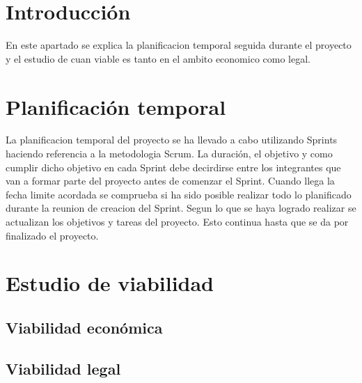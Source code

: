 
\section{Introducción}
En este apartado se explica la planificacion temporal seguida durante el proyecto y el estudio de cuan viable es tanto en el ambito economico como legal.
	
\section{Planificación temporal}
La planificacion temporal del proyecto se ha llevado a cabo utilizando Sprints haciendo referencia a la metodologia Scrum. La duración, el objetivo y como cumplir dicho objetivo en cada Sprint debe decirdirse entre los integrantes que van a formar parte del proyecto antes de comenzar el Sprint.
Cuando llega la fecha limite acordada se comprueba si ha sido posible realizar todo lo planificado durante la reunion de creacion del Sprint. Segun lo que se haya logrado realizar se actualizan los objetivos y tareas del proyecto. Esto continua hasta que se da por finalizado el proyecto.
\section{Estudio de viabilidad}

\subsection{Viabilidad económica}

\subsection{Viabilidad legal}


